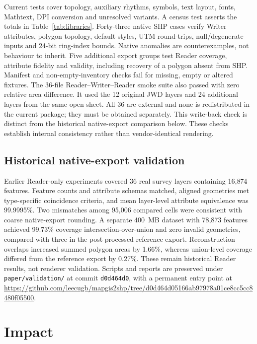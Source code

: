 \documentclass[preprint,12pt,numbers]{elsarticle}
\begin{document}
Current tests cover topology, auxiliary rhythms, symbols, text layout, fonts, Mathtext, DPI conversion and unresolved variants. A census test asserts the totals in Table~\ref{tab:libraries}. Forty-three native SHP cases verify Writer attributes, polygon topology, default styles, UTM round-trips, null/degenerate inputs and 24-bit ring-index bounds. Native anomalies are counterexamples, not behaviour to inherit. Five additional export groups test Reader coverage, attribute fidelity and validity, including recovery of a polygon absent from SHP. Manifest and non-empty-inventory checks fail for missing, empty or altered fixtures. The 36-file Reader--Writer--Reader smoke suite also passed with zero relative area difference. It used the 12 original JWD layers and 24 additional layers from the same open sheet. All 36 are external and none is redistributed in the current package; they must be obtained separately. This write-back check is distinct from the historical native-export comparison below. These checks establish internal consistency rather than vendor-identical rendering.

\subsection{Historical native-export validation}

Earlier Reader-only experiments covered 36 real survey layers containing 16{,}874 features. Feature counts and attribute schemas matched, aligned geometries met type-specific coincidence criteria, and mean layer-level attribute equivalence was 99.9995\%. Two mismatches among 95{,}006 compared cells were consistent with coarse native-export rounding. A separate 400~MB dataset with 78{,}873 features achieved 99.73\% coverage intersection-over-union and zero invalid geometries, compared with three in the post-processed reference export. Reconstruction overlaps increased summed polygon areas by 1.66\%, whereas union-level coverage differed from the reference export by 0.27\%. These remain historical Reader results, not renderer validation. Scripts and reports are preserved under \texttt{paper/validation/} at commit \texttt{d0d464d0}, with a permanent entry point at \url{https://github.com/leecugb/mapgis2shp/tree/d0d464d05166ab97978a01ce8cc5cc8480f05500}.

\section{Impact}
\end{document}
